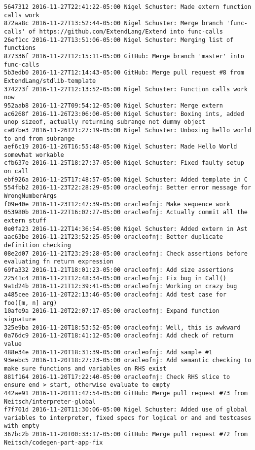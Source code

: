 \begin{lstlisting}
5647312 2016-11-27T22:41:22-05:00 Nigel Schuster: Made extern function calls work
872aa8c 2016-11-27T13:52:44-05:00 Nigel Schuster: Merge branch 'func-calls' of https://github.com/ExtendLang/Extend into func-calls
26ef1cc 2016-11-27T13:51:06-05:00 Nigel Schuster: Merging list of functions
877336f 2016-11-27T12:15:11-05:00 GitHub: Merge branch 'master' into func-calls
5b3edb0 2016-11-27T12:14:43-05:00 GitHub: Merge pull request #8 from ExtendLang/stdlib-template
374273f 2016-11-27T12:13:52-05:00 Nigel Schuster: Function calls work now
952aab8 2016-11-27T09:54:12-05:00 Nigel Schuster: Merge extern
ac6268f 2016-11-26T23:06:00-05:00 Nigel Schuster: Boxing ints, added unop sizeof, actually returning subrange not dummy object
ca07be3 2016-11-26T21:27:19-05:00 Nigel Schuster: Unboxing hello world to and from subrange
aef6c19 2016-11-26T16:55:48-05:00 Nigel Schuster: Made Hello World somewhat workable
cfb637e 2016-11-25T18:27:37-05:00 Nigel Schuster: Fixed faulty setup on call
ebf926a 2016-11-25T17:48:57-05:00 Nigel Schuster: Added template in C
554fbb2 2016-11-23T22:28:29-05:00 oracleofnj: Better error message for WrongNumberArgs
f09e40e 2016-11-23T12:47:39-05:00 oracleofnj: Make sequence work
053980b 2016-11-22T16:02:27-05:00 oracleofnj: Actually commit all the extern stuff
0e0fa23 2016-11-22T14:36:54-05:00 Nigel Schuster: Added extern in Ast
aac63be 2016-11-21T23:52:25-05:00 oracleofnj: Better duplicate definition checking
08e2d07 2016-11-21T23:29:28-05:00 oracleofnj: Check assertions before evaluating fn return expression
69fa332 2016-11-21T18:01:23-05:00 oracleofnj: Add size assertions
22541c4 2016-11-21T12:48:34-05:00 oracleofnj: Fix bug in Call()
9a1d24b 2016-11-21T12:39:41-05:00 oracleofnj: Working on crazy bug
a485cee 2016-11-20T22:13:46-05:00 oracleofnj: Add test case for foo([m, n] arg)
10afe9a 2016-11-20T22:07:17-05:00 oracleofnj: Expand function signature
325e9ba 2016-11-20T18:53:52-05:00 oracleofnj: Well, this is awkward
0a76dc9 2016-11-20T18:41:12-05:00 oracleofnj: Add check of return value
488e34e 2016-11-20T18:31:39-05:00 oracleofnj: Add sample #1
93eebc5 2016-11-20T18:27:23-05:00 oracleofnj: Add semantic checking to make sure functions and variables on RHS exist
881f164 2016-11-20T17:22:40-05:00 oracleofnj: Check RHS slice to ensure end > start, otherwise evaluate to empty
442ae91 2016-11-20T11:42:54-05:00 GitHub: Merge pull request #73 from Neitsch/interpreter-global
f7f701d 2016-11-20T11:30:06-05:00 Nigel Schuster: Added use of global variables to interpreter, fixed specs for logical or and and testcases with empty
367bc2b 2016-11-20T00:33:17-05:00 GitHub: Merge pull request #72 from Neitsch/codegen-part-app-fix

\end{lstlisting}
